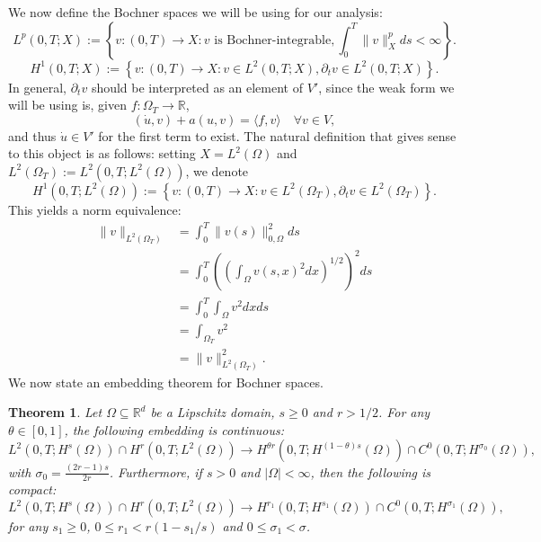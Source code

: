 \documentclass{article}
\newcommand{\R}{\mathbb{R}}
\newtheorem{theorem}{Theorem}
\begin{document}
We now define the Bochner spaces we will be using for our analysis:
\begin{equation*}
    L^p(0,T; X) := \left\{v:(0,T)\to X: v \text{ is Bochner-integrable}, \int_0^T \|v\|_X^p ds <\infty \right\}.
\end{equation*}
\begin{equation*}
    H^1(0,T; X) := \left\{v:(0,T)\to X: v\in L^2(0,T;X), \partial_t v\in L^2(0,T;X) \right\}.
\end{equation*}
In general, $\partial_t v$ should be interpreted as an element of $V'$, since the weak form we will be using is, given $f:\Omega_T\to \R$,
\begin{equation*}
    (\dot{u},v) + a(u,v) = \langle f, v\rangle \quad \forall v\in V,
\end{equation*}
and thus $\dot{u}\in V'$ for the first term to exist. The natural definition that gives sense to this object is as follows: setting $X=L^2(\Omega)$ and $L^2(\Omega_T) := L^2(0,T; L^2(\Omega))$, we denote
\begin{equation*}
    H^1(0,T;L^2(\Omega)) := \left\{v:(0,T)\to X: v\in L^2(\Omega_T), \partial_t v\in L^2(\Omega_T) \right\}.
\end{equation*}
This yields a norm equivalence:
\begin{align*}
    \|v\|_{L^2(\Omega_T)} &= \int_0^T \|v(s)\|_{0,\Omega}^2 ds\\
    &= \int_0^T \left(\left(\int_\Omega v(s,x)^2 dx\right)^{1/2}\right)^2ds\\
    &= \int_0^T \int_\Omega v^2 dxds\\
    &= \int_{\Omega_T} v^2\\
    &= \|v\|^2_{L^2(\Omega_T)}.
\end{align*}
We now state an embedding theorem for Bochner spaces.
\begin{theorem}
    Let $\Omega\subseteq \R^d$ be a Lipschitz domain, $s\geq 0$ and $r>1/2$. For any $\theta\in[0,1]$, the following embedding is continuous:
    \begin{equation*}
        L^2(0,T;H^s(\Omega))\cap H^r(0,T;L^2(\Omega)) \longrightarrow H^{\theta r}(0,T;H^{(1-\theta)s}(\Omega))\cap C^0(0,T;H^{\sigma_0}(\Omega)),
    \end{equation*}
    with $\sigma_0 = \frac{(2r-1)s}{2r}$. Furthermore, if $s>0$ and $|\Omega|<\infty$, then the following is compact:
    \begin{equation*}
        L^2(0,T;H^s(\Omega))\cap H^r(0,T;L^2(\Omega)) \longrightarrow H^{r_1}(0,T;H^{s_1}(\Omega))\cap C^0(0,T;H^{\sigma_1}(\Omega)),
    \end{equation*}
    for any $s_1\geq 0$, $0\leq r_1 < r(1-s_1/s)$ and $0\leq \sigma_1 < \sigma$.
\end{theorem}
\end{document}
